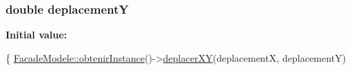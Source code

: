 \subsubsection[{deplacement\+Y}]{\setlength{\rightskip}{0pt plus 5cm}double deplacement\+Y}\label{group__inf2990_ga84b180f09e9802d980aa3f7cc71703da}
{\bfseries Initial value\+:}
\begin{DoxyCode}
\{
        \hyperlink{group__inf2990_ga63593b81c6f3cc2251e2b61d9e8fc670}{FacadeModele::obtenirInstance}()->\hyperlink{group__inf2990_ga1d0468d14d18990c39861b22d4921a7c}{deplacerXY}(deplacementX, 
      deplacementY)
\end{DoxyCode}
